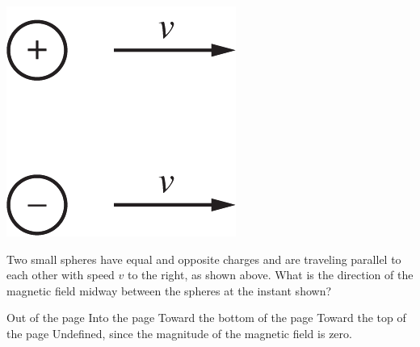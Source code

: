 
\begin{center}
    \includegraphics[scale=0.3]{images/img-015-028.png}
\end{center}

\begin{questions}
\setcounter{question}{31}

\question
Two small spheres have equal and opposite charges and are traveling parallel to each other with speed $v$ to the right, as shown above. What is the direction of the magnetic field midway between the spheres at the instant shown?

\begin{choices}
    \choice Out of the page
    \choice Into the page
    \choice Toward the bottom of the page
    \choice Toward the top of the page
    \choice Undefined, since the magnitude of the magnetic field is zero.
\end{choices}

\end{questions}
